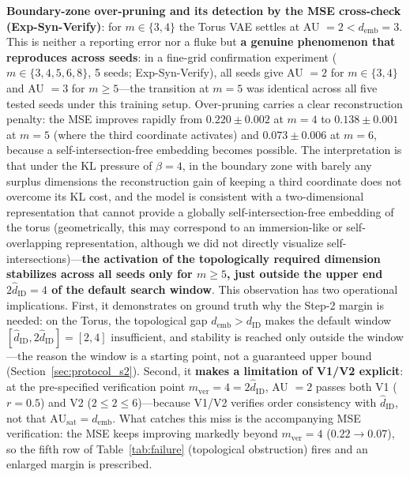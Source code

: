 \documentclass[make,article,submit,pdftex,moreauthors]{Definitions/mdpi}
\newcommand{\dID}{d_{\mathrm{ID}}}
\newcommand{\hatdID}{\hat{d}_{\mathrm{ID}}}
\newcommand{\AUsat}{\mathrm{AU}_{\mathrm{sat}}}
\newcommand{\demb}{d_{\mathrm{emb}}}
\begin{document}
\textbf{Boundary-zone over-pruning and its detection by the MSE
cross-check (Exp-Syn-Verify)}:
for $m \in \{3, 4\}$ the Torus VAE settles at AU $= 2 < \demb = 3$.
This is neither a reporting error nor a fluke but \textbf{a genuine
phenomenon that reproduces across seeds}: in a fine-grid
confirmation experiment ($m \in \{3, 4, 5, 6, 8\}$, 5 seeds;
Exp-Syn-Verify), all seeds give AU $= 2$ for $m \in \{3, 4\}$ and
AU $= 3$ for $m \geq 5$---the transition at $m = 5$ was identical across
all five tested seeds under this training setup.
Over-pruning carries a clear reconstruction penalty: the MSE improves
rapidly from $0.220 \pm 0.002$ at $m = 4$ to $0.138 \pm 0.001$ at $m = 5$
(where the third coordinate activates) and $0.073 \pm 0.006$ at $m = 6$,
because a self-intersection-free embedding becomes possible.
The interpretation is that under the KL pressure of $\beta = 4$, in the
boundary zone with barely any surplus dimensions the reconstruction gain of
keeping a third coordinate does not overcome its KL cost, and the model is
consistent with a two-dimensional representation that cannot provide a
globally self-intersection-free embedding of the torus (geometrically, this
may correspond to an immersion-like or self-overlapping representation,
although we did not directly visualize
self-intersections)---\textbf{the activation of the topologically required dimension
stabilizes across all seeds only for $m \geq 5$, just outside the upper end
$2\hatdID = 4$ of the default search window}.
This observation has two operational implications.
First, it demonstrates on ground truth why the Step-2 margin is needed: on
the Torus, the topological gap $\demb > \dID$ makes the default window
$[\hatdID, 2\hatdID] = [2, 4]$ insufficient, and stability is reached only
outside the window---the reason the window is a starting point, not a
guaranteed upper bound (Section~\ref{sec:protocol_s2}).
Second, it \textbf{makes a limitation of V1/V2 explicit}: at the
pre-specified verification point $m_{\mathrm{ver}} = 4 = 2\hatdID$, AU
$= 2$ passes both V1 ($r = 0.5$) and V2 ($2 \leq 2 \leq 6$)---because
V1/V2 verifies order consistency with $\hatdID$, not that
$\AUsat = \demb$.
What catches this miss is the accompanying MSE verification: the MSE keeps
improving markedly beyond $m_{\mathrm{ver}} = 4$ ($0.22 \to 0.07$), so the
fifth row of Table~\ref{tab:failure} (topological obstruction) fires and
an enlarged margin is prescribed.
\end{document}
